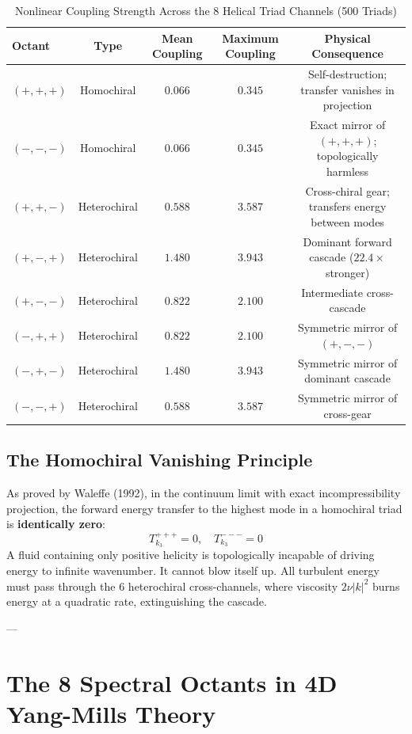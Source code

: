 \documentclass[11pt,a4paper]{article}
\begin{document}
\begin{table}[h!]
\centering
\caption{Nonlinear Coupling Strength Across the 8 Helical Triad Channels (500 Triads)}
\vspace{0.2cm}
\begin{tabular}{lcccc}
\toprule
\textbf{Octant} & \textbf{Type} & \textbf{Mean Coupling} & \textbf{Maximum Coupling} & \textbf{Physical Consequence} \\
\midrule
$(+, +, +)$ & Homochiral & $0.066$ & $0.345$ & Self-destruction; transfer vanishes in projection \\
$(-, -, -)$ & Homochiral & $0.066$ & $0.345$ & Exact mirror of $(+,+,+)$; topologically harmless \\
$(+, +, -)$ & Heterochiral & $0.588$ & $3.587$ & Cross-chiral gear; transfers energy between modes \\
$(+, -, +)$ & Heterochiral & $1.480$ & $3.943$ & Dominant forward cascade ($22.4\times$ stronger) \\
$(+, -, -)$ & Heterochiral & $0.822$ & $2.100$ & Intermediate cross-cascade \\
$(-, +, +)$ & Heterochiral & $0.822$ & $2.100$ & Symmetric mirror of $(+,-,-)$ \\
$(-, +, -)$ & Heterochiral & $1.480$ & $3.943$ & Symmetric mirror of dominant cascade \\
$(-, -, +)$ & Heterochiral & $0.588$ & $3.587$ & Symmetric mirror of cross-gear \\
\bottomrule
\end{tabular}
\end{table}

\subsection{The Homochiral Vanishing Principle}

As proved by Waleffe (1992), in the continuum limit with exact incompressibility projection, the forward energy transfer to the highest mode in a homochiral triad is \textbf{identically zero}:
$$T_{k_3}^{+++} = 0, \quad T_{k_3}^{---} = 0$$
A fluid containing only positive helicity is topologically incapable of driving energy to infinite wavenumber. It cannot blow itself up. All turbulent energy must pass through the 6 heterochiral cross-channels, where viscosity $2 \nu |k|^2$ burns energy at a quadratic rate, extinguishing the cascade.

---

\section{The 8 Spectral Octants in 4D Yang-Mills Theory}
\end{document}
